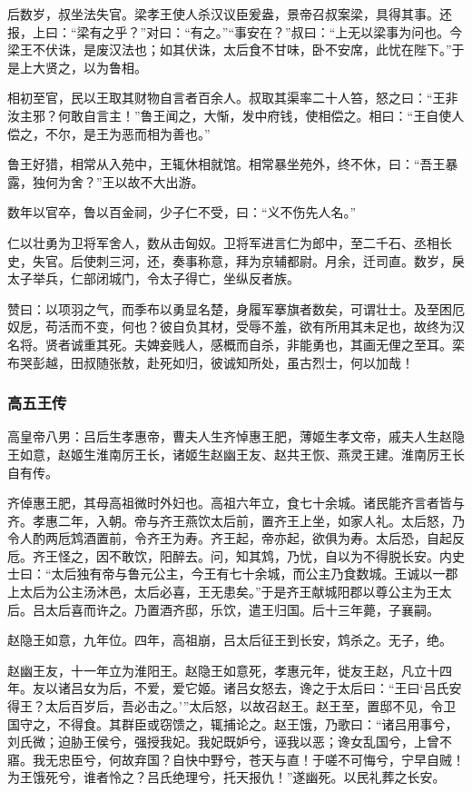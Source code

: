 \documentclass[]{article}
\begin{document}
后数岁，叔坐法失官。梁孝王使人杀汉议臣爰盎，景帝召叔案梁，具得其事。还报，上曰：``梁有之乎？''对曰：``有之。''``事安在？''叔曰：``上无以梁事为问也。今梁王不伏诛，是废汉法也；如其伏诛，太后食不甘味，卧不安席，此忧在陛下。''于是上大贤之，以为鲁相。

相初至官，民以王取其财物自言者百余人。叔取其渠率二十人笞，怒之曰：``王非汝主邪？何敢自言主！''鲁王闻之，大惭，发中府钱，使相偿之。相曰：``王自使人偿之，不尔，是王为恶而相为善也。''

鲁王好猎，相常从入苑中，王辄休相就馆。相常暴坐苑外，终不休，曰：``吾王暴露，独何为舍？''王以故不大出游。

数年以官卒，鲁以百金祠，少子仁不受，曰：``义不伤先人名。''

仁以壮勇为卫将军舍人，数从击匈奴。卫将军进言仁为郎中，至二千石、丞相长史，失官。后使刺三河，还，奏事称意，拜为京辅都尉。月余，迁司直。数岁，戾太子举兵，仁部闭城门，令太子得亡，坐纵反者族。

赞曰：以项羽之气，而季布以勇显名楚，身履军搴旗者数矣，可谓壮士。及至困厄奴戹，苟活而不变，何也？彼自负其材，受辱不羞，欲有所用其未足也，故终为汉名将。贤者诚重其死。夫婢妾贱人，感概而自杀，非能勇也，其画无俚之至耳。栾布哭彭越，田叔随张敖，赴死如归，彼诚知所处，虽古烈士，何以加哉！

\hypertarget{header-n3692}{%
\subsubsection{高五王传}\label{header-n3692}}

高皇帝八男：吕后生孝惠帝，曹夫人生齐悼惠王肥，薄姬生孝文帝，戚夫人生赵隐王如意，赵姬生淮南厉王长，诸姬生赵幽王友、赵共王恢、燕灵王建。淮南厉王长自有传。

齐倬惠王肥，其母高祖微时外妇也。高祖六年立，食七十余城。诸民能齐言者皆与齐。孝惠二年，入朝。帝与齐王燕饮太后前，置齐王上坐，如家人礼。太后怒，乃令人酌两卮鸩酒置前，令齐王为寿。齐王起，帝亦起，欲俱为寿。太后恐，自起反卮。齐王怪之，因不敢饮，阳醉去。问，知其鸩，乃忧，自以为不得脱长安。内史士曰：``太后独有帝与鲁元公主，今王有七十余城，而公主乃食数城。王诚以一郡上太后为公主汤沐邑，太后必喜，王无患矣。''于是齐王献城阳郡以尊公主为王太后。吕太后喜而许之。乃置酒齐邸，乐饮，遣王归国。后十三年薨，子襄嗣。

赵隐王如意，九年位。四年，高祖崩，吕太后征王到长安，鸩杀之。无子，绝。

赵幽王友，十一年立为淮阳王。赵隐王如意死，孝惠元年，徙友王赵，凡立十四年。友以诸吕女为后，不爱，爱它姬。诸吕女怒去，谗之于太后曰：``王曰`吕氏安得王？太后百岁后，吾必击之。'''太后怒，以故召赵王。赵王至，置邸不见，令卫国守之，不得食。其群臣或窃馈之，辄捕论之。赵王饿，乃歌曰：``诸吕用事兮，刘氏微；迫胁王侯兮，强授我妃。我妃既妒兮，诬我以恶；谗女乱国兮，上曾不寤。我无忠臣兮，何故弃国？自快中野兮，苍天与直！于嗟不可悔兮，宁早自贼！为王饿死兮，谁者怜之？吕氏绝理兮，托天报仇！''遂幽死。以民礼葬之长安。
\end{document}
